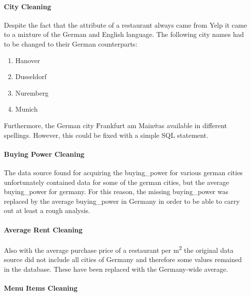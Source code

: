 \paragraph{City Cleaning}
Despite the fact that the  attribute of a restaurant always came from Yelp it came to a mixture of the German and English language.
The following city names had to be changed to their German counterparts:
\begin{enumerate}
  \item Hanover
  \item Dusseldorf
  \item Nuremberg
  \item Munich
\end{enumerate}
Furthermore, the German city \"Frankfurt am Main\" was available in different spellings.
However, this could be fixed with a simple \ac{SQL} statement.
\paragraph{Buying Power Cleaning}
The data source found for acquiring the buying\_power for various german cities unfortunately contained data for some of the german cities,
but the average buying\_power for germany.
For this reason, the missing buying\_power was replaced by the average buying\_power in Germany in order to be able to carry out at least a rough analysis.
\paragraph{Average Rent Cleaning}
Also with the average purchase price of a restaurant per m\textsuperscript{2} the original data source did not include all cities of Germany and therefore
some  values remained in the database.
These have been replaced with the Germany-wide average.
\paragraph{Menu Items Cleaning}
